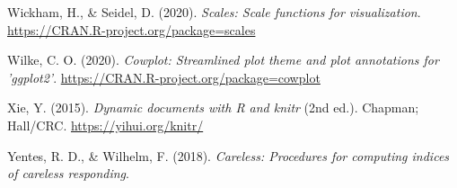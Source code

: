 \begin{appendix}
\leavevmode\hypertarget{ref-R-scales}{}%
Wickham, H., \& Seidel, D. (2020). \emph{Scales: Scale functions for
visualization}. \url{https://CRAN.R-project.org/package=scales}

\leavevmode\hypertarget{ref-R-cowplot}{}%
Wilke, C. O. (2020). \emph{Cowplot: Streamlined plot theme and plot
annotations for 'ggplot2'}.
\url{https://CRAN.R-project.org/package=cowplot}

\leavevmode\hypertarget{ref-R-knitr}{}%
Xie, Y. (2015). \emph{Dynamic documents with R and knitr} (2nd ed.).
Chapman; Hall/CRC. \url{https://yihui.org/knitr/}

\leavevmode\hypertarget{ref-R-careless}{}%
Yentes, R. D., \& Wilhelm, F. (2018). \emph{Careless: Procedures for
computing indices of careless responding}.

\endgroup
\end{appendix}
